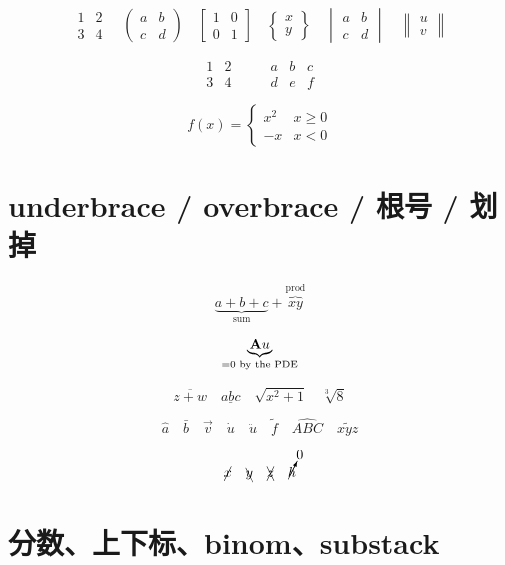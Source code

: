 \documentclass{silkmath-fixture}
\begin{document}
\[
\begin{matrix} 1 & 2 \\ 3 & 4 \end{matrix}
\quad
\begin{pmatrix} a & b \\ c & d \end{pmatrix}
\quad
\begin{bmatrix} 1 & 0 \\ 0 & 1 \end{bmatrix}
\quad
\begin{Bmatrix} x \\ y \end{Bmatrix}
\quad
\begin{vmatrix} a & b \\ c & d \end{vmatrix}
\quad
\begin{Vmatrix} u \\ v \end{Vmatrix}
\]

\[
\begin{smallmatrix} 1&2\\3&4 \end{smallmatrix}
\qquad
\begin{array}{c|cc}
  a & b & c \\
  \hline
  d & e & f
\end{array}
\]

\[
  f(x)=\begin{cases}
    x^2 & x\ge 0 \\
    -x  & x<0
  \end{cases}
\]

\section{underbrace / overbrace / 根号 / 划掉}

\[
  \underbrace{a+b+c}_{\text{sum}} + \overbrace{xy}^{\text{prod}}
\]

\[
  \underbrace{\mathbf{A} u}_{=0 \text{ by the PDE}}
\]

\[
  \overline{z+w}\quad \underline{abc}\quad \sqrt{x^2+1}\quad \sqrt[3]{8}
\]

\[
  \hat a \quad \bar b \quad \vec{v} \quad \dot u \quad \ddot u
  \quad \tilde f \quad \widehat{ABC} \quad \widetilde{xyz}
\]

\[
  \cancel{x} \quad \bcancel{y} \quad \xcancel{z} \quad \cancelto{0}{h}
\]

\section{分数、上下标、binom、substack}
\end{document}
